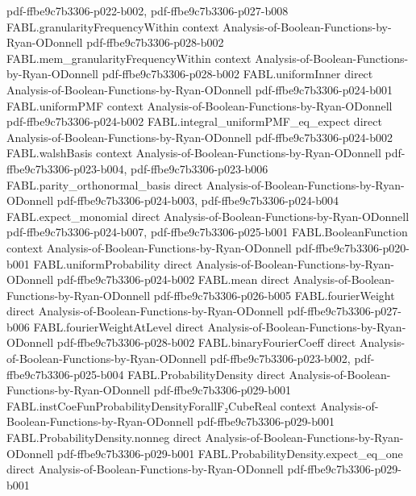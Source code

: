 \begin{theorem}
  {pdf-ffbe9c7b3306-p022-b002,
    pdf-ffbe9c7b3306-p027-b008}
\proofstep
  {FABL.granularityFrequencyWithin}
  {context}
  {Analysis-of-Boolean-Functions-by-Ryan-ODonnell}
  {pdf-ffbe9c7b3306-p028-b002}
\proofstep
  {FABL.mem_granularityFrequencyWithin}
  {context}
  {Analysis-of-Boolean-Functions-by-Ryan-ODonnell}
  {pdf-ffbe9c7b3306-p028-b002}
\proofstep
  {FABL.uniformInner}
  {direct}
  {Analysis-of-Boolean-Functions-by-Ryan-ODonnell}
  {pdf-ffbe9c7b3306-p024-b001}
\proofstep
  {FABL.uniformPMF}
  {context}
  {Analysis-of-Boolean-Functions-by-Ryan-ODonnell}
  {pdf-ffbe9c7b3306-p024-b002}
\proofstep
  {FABL.integral_uniformPMF_eq_expect}
  {direct}
  {Analysis-of-Boolean-Functions-by-Ryan-ODonnell}
  {pdf-ffbe9c7b3306-p024-b002}
\proofstep
  {FABL.walshBasis}
  {context}
  {Analysis-of-Boolean-Functions-by-Ryan-ODonnell}
  {pdf-ffbe9c7b3306-p023-b004,
    pdf-ffbe9c7b3306-p023-b006}
\proofstep
  {FABL.parity_orthonormal_basis}
  {direct}
  {Analysis-of-Boolean-Functions-by-Ryan-ODonnell}
  {pdf-ffbe9c7b3306-p024-b003,
    pdf-ffbe9c7b3306-p024-b004}
\proofstep
  {FABL.expect_monomial}
  {direct}
  {Analysis-of-Boolean-Functions-by-Ryan-ODonnell}
  {pdf-ffbe9c7b3306-p024-b007,
    pdf-ffbe9c7b3306-p025-b001}
\proofstep
  {FABL.BooleanFunction}
  {context}
  {Analysis-of-Boolean-Functions-by-Ryan-ODonnell}
  {pdf-ffbe9c7b3306-p020-b001}
\proofstep
  {FABL.uniformProbability}
  {direct}
  {Analysis-of-Boolean-Functions-by-Ryan-ODonnell}
  {pdf-ffbe9c7b3306-p024-b002}
\proofstep
  {FABL.mean}
  {direct}
  {Analysis-of-Boolean-Functions-by-Ryan-ODonnell}
  {pdf-ffbe9c7b3306-p026-b005}
\proofstep
  {FABL.fourierWeight}
  {direct}
  {Analysis-of-Boolean-Functions-by-Ryan-ODonnell}
  {pdf-ffbe9c7b3306-p027-b006}
\proofstep
  {FABL.fourierWeightAtLevel}
  {direct}
  {Analysis-of-Boolean-Functions-by-Ryan-ODonnell}
  {pdf-ffbe9c7b3306-p028-b002}
\proofstep
  {FABL.binaryFourierCoeff}
  {direct}
  {Analysis-of-Boolean-Functions-by-Ryan-ODonnell}
  {pdf-ffbe9c7b3306-p023-b002,
    pdf-ffbe9c7b3306-p025-b004}
\proofstep
  {FABL.ProbabilityDensity}
  {direct}
  {Analysis-of-Boolean-Functions-by-Ryan-ODonnell}
  {pdf-ffbe9c7b3306-p029-b001}
\proofstep
  {FABL.instCoeFunProbabilityDensityForallF₂CubeReal}
  {context}
  {Analysis-of-Boolean-Functions-by-Ryan-ODonnell}
  {pdf-ffbe9c7b3306-p029-b001}
\proofstep
  {FABL.ProbabilityDensity.nonneg}
  {direct}
  {Analysis-of-Boolean-Functions-by-Ryan-ODonnell}
  {pdf-ffbe9c7b3306-p029-b001}
\proofstep
  {FABL.ProbabilityDensity.expect_eq_one}
  {direct}
  {Analysis-of-Boolean-Functions-by-Ryan-ODonnell}
  {pdf-ffbe9c7b3306-p029-b001}

\end{theorem}
